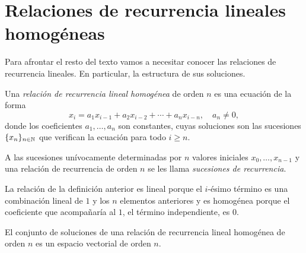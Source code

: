 \section{Relaciones de recurrencia lineales homogéneas}

Para afrontar el resto del texto vamos a necesitar
conocer las relaciones de recurrencia lineales.
En particular, la estructura de sus soluciones.

\begin{definition}
    Una \emph{relación de recurrencia lineal homogénea} de orden $n$
    es una ecuación de la forma
    \begin{equation*}
        x_i = a_1x_{i-1} + a_2x_{i-2} + \cdots + a_nx_{i-n},
        \quad a_n \ne 0,
    \end{equation*}
    donde los coeficientes $a_1,\ldots,a_n$ son constantes,
    cuyas soluciones son las sucesiones $\{x_n\}_{n \in \mathbb{N}}$
    que verifican la ecuación para todo $i \ge n$.

    A las sucesiones unívocamente determinadas por
    $n$ valores iniciales $x_0,\ldots,x_{n-1}$
    y una relación de recurrencia de orden $n$
    se les llama \emph{sucesiones de recurrencia}.
\end{definition}

\begin{remark}
    La relación de la definición anterior es lineal porque el $i$-ésimo término
    es una combinación lineal de $1$ y los $n$ elementos anteriores
    y es homogénea porque el coeficiente que acompañaría al $1$,
    el término independiente,
    es $0$.
\end{remark}

\begin{theorem}
    El conjunto de soluciones de una
    relación de recurrencia lineal homogénea de orden $n$
    es un espacio vectorial de orden $n$.
\end{theorem}

